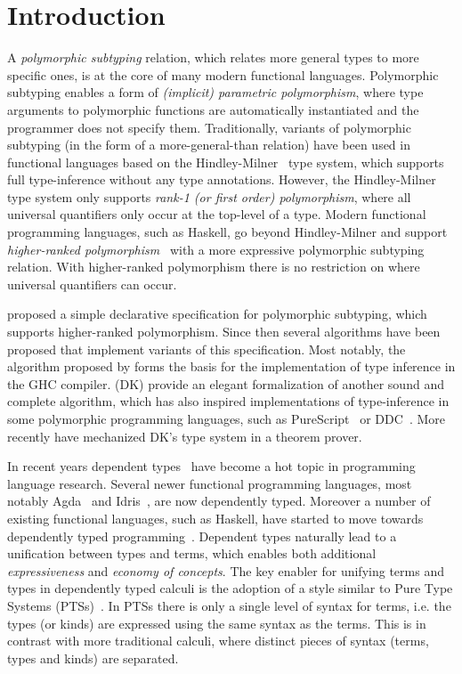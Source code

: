 \section{Introduction}

A \emph{polymorphic subtyping} relation, which relates more general
types to more specific ones, is at the core of many modern functional
languages. Polymorphic subtyping enables a form of
\emph{(implicit) parametric polymorphism}, where type arguments to polymorphic
functions are automatically instantiated and the programmer does not specify them.
Traditionally, variants of polymorphic subtyping (in the form of a more-general-than relation)
have been used in functional languages based on the
Hindley-Milner~\citep{hindley1969principal,milner1978theory,damas1982principal}
type system, which supports full type-inference without any type annotations.
However, the Hindley-Milner type system only supports \emph{rank-1 (or first order)
polymorphism}, where all universal quantifiers only occur at the top-level
of a type.  Modern functional programming languages, such as Haskell, go beyond
Hindley-Milner and support \emph{higher-ranked polymorphism}~\citep{odersky1996putting,jones2007practical}
with a more expressive
polymorphic subtyping relation. With higher-ranked
polymorphism there is no restriction on where universal quantifiers can occur.

\citet{odersky1996putting} proposed a
simple declarative specification for polymorphic subtyping, which supports higher-ranked polymorphism.
Since then several
algorithms have been proposed that implement variants of this specification. Most
notably, the algorithm proposed by \citet{jones2007practical} forms the basis
for the implementation of type inference in the GHC compiler.
\citet{dunfield2013complete} (DK) provide an elegant
formalization of another sound and complete algorithm, which has
also inspired implementations of type-inference in some polymorphic
programming languages, such as PureScript~\citep{PureScript} or DDC~\citep{Disciple}.
More recently \citet{zhao19mechanical} have mechanized DK's type system in a theorem prover.


In recent years dependent
types~\citep{coc,cayenne,dep:pisigma,sjoberg:msfp12,guru,fc:kind,zombie:popl14,zombie:popl15}
have become a hot topic in programming
language research. Several newer
functional programming languages, most notably Agda~\citep{2007_norell_agda} and
Idris~\citep{brady2013idris}, are now dependently typed. Moreover a number of existing functional
languages, such as Haskell, have started to move towards dependently typed programming~\citep{dependenthaskell}. Dependent types naturally lead to a unification between types and terms, which enables both
additional \emph{expressiveness} and \emph{economy of concepts}.
The key enabler for unifying terms and types in dependently typed
calculi is the adoption of a style similar to
Pure Type Systems (PTSs)~\citep{pts}. In PTSs there is only a single level
of syntax for terms, i.e. the types (or kinds) are expressed using the
same syntax as the terms. This is in contrast with more traditional calculi, where
distinct pieces of syntax (terms, types and kinds) are separated.

